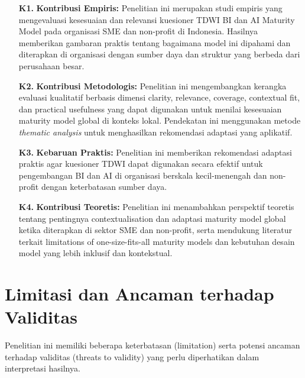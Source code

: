 \documentclass{article}
\begin{document}
\begin{enumerate}
	\item[\textbf{K1.}] \textbf{Kontribusi Empiris:}  
	Penelitian ini merupakan studi empiris yang mengevaluasi kesesuaian dan relevansi kuesioner TDWI BI dan AI Maturity Model pada organisasi SME dan non-profit di Indonesia. Hasilnya memberikan gambaran praktis tentang bagaimana model ini dipahami dan diterapkan di organisasi dengan sumber daya dan struktur yang berbeda dari perusahaan besar.
	
	\item[\textbf{K2.}] \textbf{Kontribusi Metodologis:}  
	Penelitian ini mengembangkan kerangka evaluasi kualitatif berbasis dimensi clarity, relevance, coverage, contextual fit, dan practical usefulness yang dapat digunakan untuk menilai kesesuaian maturity model global di konteks lokal. Pendekatan ini menggunakan metode \textit{thematic analysis} untuk menghasilkan rekomendasi adaptasi yang aplikatif.
	
	\item[\textbf{K3.}] \textbf{Kebaruan Praktis:}  
	Penelitian ini memberikan rekomendasi adaptasi praktis agar kuesioner TDWI dapat digunakan secara efektif untuk pengembangan BI dan AI di organisasi berskala kecil-menengah dan non-profit dengan keterbatasan sumber daya.
	
	\item[\textbf{K4.}] \textbf{Kontribusi Teoretis:}  
	Penelitian ini menambahkan perspektif teoretis tentang pentingnya contextualisation dan adaptasi maturity model global ketika diterapkan di sektor SME dan non-profit, serta mendukung literatur terkait limitations of one-size-fits-all maturity models dan kebutuhan desain model yang lebih inklusif dan kontekstual.
\end{enumerate}


\section{Limitasi dan Ancaman terhadap Validitas}
Penelitian ini memiliki beberapa keterbatasan (limitation) serta potensi ancaman terhadap validitas (threats to validity) yang perlu diperhatikan dalam interpretasi hasilnya.
\end{document}
